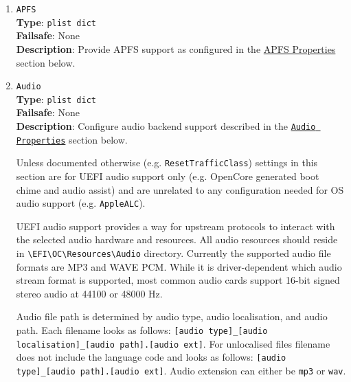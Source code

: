 \documentclass[]{article}
\begin{document}
\begin{enumerate}
\item
  \texttt{APFS}\\
  \textbf{Type}: \texttt{plist\ dict}\\
  \textbf{Failsafe}: None\\
  \textbf{Description}: Provide APFS support as configured in the
  \hyperref[uefiapfsprops]{APFS Properties} section below.

\item
  \texttt{Audio}\\
  \textbf{Type}: \texttt{plist\ dict}\\
  \textbf{Failsafe}: None\\
  \textbf{Description}: Configure audio backend support described
  in the \hyperref[uefiaudioprops]{\texttt{Audio Properties}} section below.

  Unless documented otherwise (e.g. \texttt{ResetTrafficClass}) settings in this section
  are for UEFI audio support only (e.g. OpenCore generated boot chime and audio assist) and are
  unrelated to any configuration needed for OS audio support (e.g. \texttt{AppleALC}).

  UEFI audio support provides a way for upstream protocols to interact with the
  selected audio hardware and resources. All audio resources should reside
  in \texttt{\textbackslash EFI\textbackslash OC\textbackslash Resources\textbackslash Audio}
  directory. Currently the supported audio file formats are MP3 and WAVE PCM. While it is
  driver-dependent which audio stream format is supported, most common audio cards
  support 16-bit signed stereo audio at 44100 or 48000 Hz.

  Audio file path is determined by audio type, audio localisation, and audio path. Each filename
  looks as follows: \texttt{[audio type]\_[audio localisation]\_[audio path].[audio ext]}.
  For unlocalised files filename does not include the language code and looks as follows:
  \texttt{[audio type]\_[audio path].[audio ext]}. Audio extension can either be \texttt{mp3}
  or \texttt{wav}.


\end{enumerate}
\end{document}
